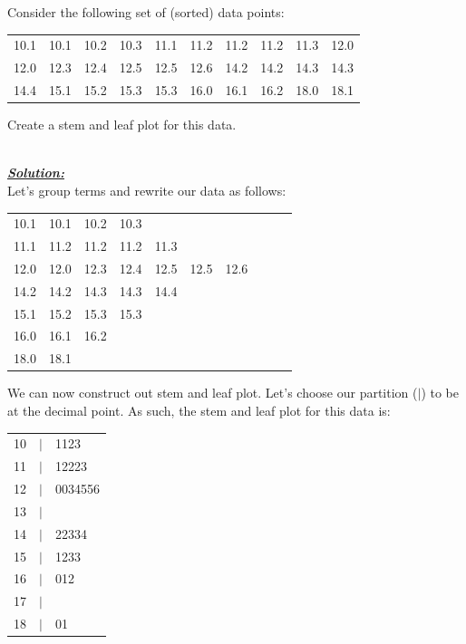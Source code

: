 \begin{example}
Consider the following set of (sorted) data points:
\begin{center}
\begin{tabular}{c c c c c c c c c c}
10.1	&	10.1	&	10.2	&	10.3	&	11.1	&	11.2	&	11.2	&	11.2	&	11.3	&	12.0	\\ 
12.0	&	12.3	&	12.4	&	12.5	&	12.5	&	12.6	&	14.2	&	14.2	&	14.3	&	14.3	\\
14.4	&	15.1	&	15.2	&	15.3	&	15.3	&	16.0	&	16.1	&	16.2	&	 18.0	&	18.1
\end{tabular}
\end{center}

Create a stem and leaf plot for this data.

\hfill\\
{\emph{\textbf{\underline{Solution:}}}}\\

\noindent
Let's group terms and rewrite our data as follows:
\begin{center}
\begin{tabular}{c c c c c c c c c c}
10.1	&	10.1	&	10.2	&	10.3	\\ 
11.1	&	11.2	&	11.2	&	11.2	&	11.3	\\
12.0	&	12.0	&	12.3	&	12.4	&	12.5	&	12.5	&	12.6	\\
14.2	&	14.2	&	14.3	&	14.3	&	14.4	\\	
15.1	&	15.2	&	15.3	&	15.3	\\
16.0	&	16.1	&	16.2	\\
18.0	&	18.1	\\
\end{tabular}
\end{center}

\noindent
We can now construct out stem and leaf plot. 
Let's choose our partition ($|$) to be at the decimal point.
As such, the stem and leaf plot for this data is:\\

\begin{center}
\begin{tabular}{r c l}
10	&	$|$	&	1123		\\
11	&	$|$	&	12223	\\
12	&	$|$	&	0034556	\\
13	&	$|$	&			\\
14	&	$|$	&	22334	\\
15	&	$|$	&	1233		\\
16	&	$|$	&	012		\\
17	&	$|$	&			\\
18	&	$|$	&	01		\\
\end{tabular}
\end{center}
\end{example}